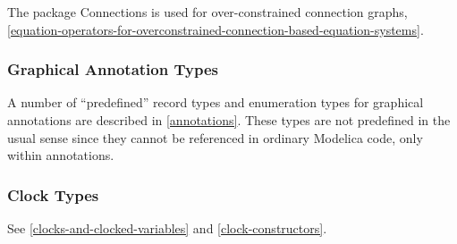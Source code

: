 The package Connections is used for over-constrained connection graphs,
\autoref{equation-operators-for-overconstrained-connection-based-equation-systems}.

\subsubsection{Graphical Annotation Types}

A number of ``predefined'' record types and enumeration types for
graphical annotations are described in \autoref{annotations}. These types are not
predefined in the usual sense since they cannot be referenced in
ordinary Modelica code, only within annotations.

\subsubsection{Clock Types}

See \autoref{clocks-and-clocked-variables} and \autoref{clock-constructors}.
